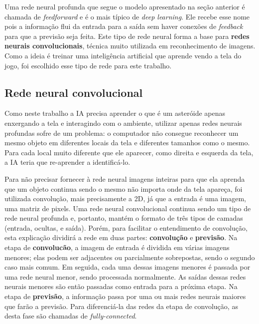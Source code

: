 Uma rede neural profunda que segue o modelo apresentado na seção anterior é chamada de \textit{feedforward} e é o mais típico de \textit{deep learning}. Ele recebe esse nome pois a informação flui da entrada para a saída sem haver conexões de \textit{feedback} para que a previsão seja feita. Este tipo de rede neural forma a base para \textbf{redes neurais convolucionais}, técnica muito utilizada em reconhecimento de imagens. Como a ideia é treinar uma inteligência artificial que aprende vendo a tela do jogo, foi escolhido esse tipo de rede para este trabalho.


\subsection{Rede neural convolucional}
\label{sec:cnn}

Como neste trabalho a IA precisa aprender o que é um asteróide apenas enxergando a tela e interagindo com o ambiente, utilizar apenas redes neurais profundas sofre de um problema: o computador não consegue reconhecer um mesmo objeto em diferentes locais da tela e diferentes tamanhos como o mesmo. Para cada local muito diferente que ele aparecer, como direita e esquerda da tela, a IA teria que re-aprender a identificá-lo.

Para não precisar fornecer à rede neural imagens inteiras para que ela aprenda que um objeto continua sendo o mesmo não importa onde da tela apareça, foi utilizada convolução, mais precisamente a 2D, já que a entrada é uma imagem, uma matriz de pixels.
Uma rede neural convolucional continua sendo um tipo de rede neural profunda e, portanto, mantém o formato de três tipos de camadas (entrada, ocultas, e saída). Porém, para facilitar o entendimento de convolução, esta explicação dividirá a rede em duas partes: \textbf{convolução} e \textbf{previsão}.
Na etapa de \textbf{convolucão}, a imagem de entrada é dividida em várias imagens menores; elas podem ser adjacentes ou parcialmente sobrepostas, sendo o segundo caso mais comum. Em seguida, cada uma dessas imagens menores é passada por uma rede neural menor, sendo processada normalmente. As saídas dessas redes neurais menores são então passadas como entrada para a próxima etapa.
Na etapa de \textbf{previsão}, a informação passa por uma ou mais redes neurais maiores que farão a previsão. Para diferenciá-la das redes da etapa de convolução, as desta fase são chamadas de \textit{fully-connected}.

